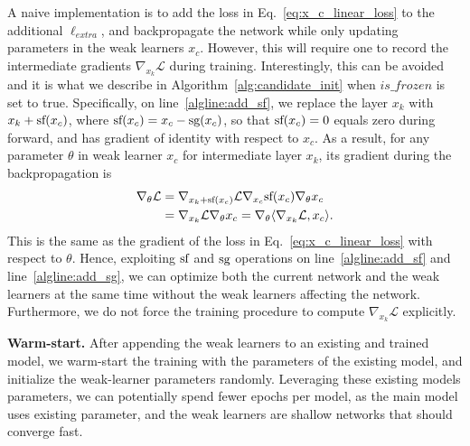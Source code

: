 A naive implementation is to add the loss in Eq.~\ref{eq:x_c_linear_loss} to the additional $\ell_{extra}$, and backpropagate the network
while only updating parameters in the weak learners $x_c$. 
However, this will require one to record the intermediate gradients $\nabla _{x_{k}} \mathcal{L}$ during training. 
Interestingly, this can be avoided and it is what we describe in Algorithm~\ref{alg:candidate_init} when $is\_frozen$ is set to true. 
Specifically, on line~\ref{algline:add_sf}, we replace the layer $x_k$ with $x_k + \textrm{sf}(x_c)$, 
where $\textrm{sf}(x_c) = x_c - \textrm{sg}(x_c)$, so that $\textrm{sf}(x_c) = 0$ equals zero during 
forward, and has gradient of identity with respect to $x_c$. As a result, 
for any parameter $\theta$ in weak learner $x_c$ for intermediate layer $x_k$, its gradient during the backpropagation is
\begin{align}
\nabla_{\theta} \mathcal{L} &= \nabla _{x_k + \textrm{sf}(x_c)} \mathcal{L} \nabla _{x_c} \textrm{sf}(x_c) \nabla _{\theta} x_c \\
&= \nabla _{x_k}\mathcal{L} \nabla _{\theta} x_c = \nabla_{\theta} \langle \nabla_{x_{k}} \mathcal{L}, x_c \rangle.
\end{align}
This is the same as the gradient of the loss in Eq.~\ref{eq:x_c_linear_loss} with respect to $\theta$.
Hence, exploiting $\textrm{sf}$ and $\textrm{sg}$ operations on line~\ref{algline:add_sf} and line~\ref{algline:add_sg}, we can
optimize both the current network and the weak learners at the same time without the weak learners affecting the network. Furthermore, 
we do not force the training procedure to compute $\nabla_{x_k} \mathcal{L}$ explicitly. 

\textbf{Warm-start.} After appending the weak learners to an existing and trained model, we warm-start the training with the parameters
of the existing model, and initialize the weak-learner parameters randomly. Leveraging these existing models parameters, 
we can potentially spend fewer epochs per model, as the main model uses existing parameter, and the weak learners are shallow
networks that should converge fast.

